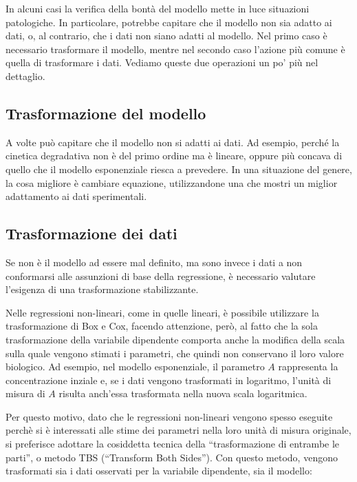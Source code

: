 \documentclass[a4paper,12pt,oneside]{book}
\begin{document}
In alcuni casi la verifica della bontà del modello mette in luce situazioni patologiche. In particolare, potrebbe capitare che il modello non sia adatto ai dati, o, al contrario, che i dati non siano adatti al modello. Nel primo caso è necessario trasformare il modello, mentre nel secondo caso l'azione più comune è quella di trasformare i dati. Vediamo queste due operazioni un po' più nel dettaglio.

\hypertarget{trasformazione-del-modello}{%
\subsection{Trasformazione del modello}\label{trasformazione-del-modello}}

A volte può capitare che il modello non si adatti ai dati. Ad esempio, perché la cinetica degradativa non è del primo ordine ma è lineare, oppure più concava di quello che il modello esponenziale riesca a prevedere. In una situazione del genere, la cosa migliore è cambiare equazione, utilizzandone una che mostri un miglior adattamento ai dati sperimentali.

\hypertarget{trasformazione-dei-dati}{%
\subsection{Trasformazione dei dati}\label{trasformazione-dei-dati}}

Se non è il modello ad essere mal definito, ma sono invece i dati a non conformarsi alle assunzioni di base della regressione, è necessario valutare l'esigenza di una trasformazione stabilizzante.

Nelle regressioni non-lineari, come in quelle lineari, è possibile utilizzare la trasformazione di Box e Cox, facendo attenzione, però, al fatto che la sola trasformazione della variabile dipendente comporta anche la modifica della scala sulla quale vengono stimati i parametri, che quindi non conservano il loro valore biologico. Ad esempio, nel modello esponenziale, il parametro \(A\) rappresenta la concentrazione inziale e, se i dati vengono trasformati in logaritmo, l'unità di misura di \(A\) risulta anch'essa trasformata nella nuova scala logaritmica.

Per questo motivo, dato che le regressioni non-lineari vengono spesso eseguite perchè si è interessati alle stime dei parametri nella loro unità di misura originale, si preferisce adottare la cosiddetta tecnica della ``trasformazione di entrambe le parti'', o metodo TBS (``Transform Both Sides''). Con questo metodo, vengono trasformati sia i dati osservati per la variabile dipendente, sia il modello:
\end{document}
